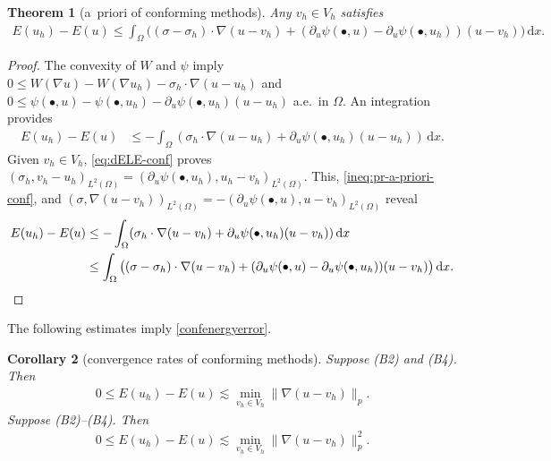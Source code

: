 \documentclass[a4paper]{amsart}
\numberwithin{equation}{section}
\renewcommand{\d}[1]{\,\mathrm{d}#1}
\newtheorem{theorem}{Theorem}[section]
\newtheorem{corollary}[theorem]{Corollary}
\theoremstyle{remark}
\begin{document}
\begin{theorem}[a~priori of conforming methods]\label{thm:a-priori-conf}
Any $v_h \in V_h$ satisfies
    \begin{align*}
        E(u_h) - E(u) \leq \int_\Omega \big((\sigma - \sigma_h) \cdot \nabla (u - v_h) + (\partial_u \psi(\bullet,u) - \partial_u \psi(\bullet,u_h)) (u - v_h)\big) \d{x}.
\end{align*}
\end{theorem}

\begin{proof}
    The convexity of 
    $W$ and $\psi$ imply
    $0 \leq W(\nabla u) - W(\nabla u_h) - \sigma_h \cdot \nabla(u - u_h)$ 
    and $0 \leq \psi(\bullet, u) - \psi(\bullet, u_h) - \partial_u \psi(\bullet, u_h)(u - u_h)$ a.e.~in $\Omega$. An integration provides
\begin{align}\label{ineq:pr-a-priori-conf}
        E(u_h) - E(u) &\leq
        - \int_\Omega (\sigma_h \cdot \nabla (u - u_h) + \partial_u \psi(\bullet, u_h)(u - u_h)) \d{x}.
    \end{align}
Given $v_h \in V_h$, \eqref{eq:dELE-conf} proves $(\sigma_h, v_h - u_h)_{L^2(\Omega)} = (\partial_u \psi(\bullet, u_h), u_h - v_h)_{L^2(\Omega)}$. 
This, \eqref{ineq:pr-a-priori-conf}, and 
$(\sigma, \nabla(u - v_h))_{L^2(\Omega)} 
= -(\partial_u \psi(\bullet, u), u - v_h)_{L^2(\Omega)}$ reveal
\begin{align*}
E(u_h) - E(u) &\leq - \int_\Omega (\sigma_h \cdot \nabla (u - v_h) 
+ \partial_u \psi(\bullet, u_h) (u - v_h)) \d{x}\\
&\leq \int_\Omega \big((\sigma - \sigma_h) \cdot \nabla (u - v_h) 
+ (\partial_u \psi(\bullet,u) 
- \partial_u \psi(\bullet,u_h)) (u - v_h)\big) \d{x}.
\qedhere
\end{align*}
\end{proof}

The following estimates imply \eqref{confenergyerror}.

\begin{corollary}[convergence rates of conforming methods]
Suppose (B2) and (B4). Then
    \begin{align*}
        0 \leq E(u_h) - E(u) \lesssim \min_{v_h \in V_h} \|\nabla(u - v_h)\|_p.
    \end{align*}
Suppose (B2)--(B4). Then
    \begin{align*}
        0 \leq E(u_h) - E(u) \lesssim \min_{v_h \in V_h} \|\nabla(u - v_h)\|_p^2.
    \end{align*}
\end{corollary}
\end{document}
